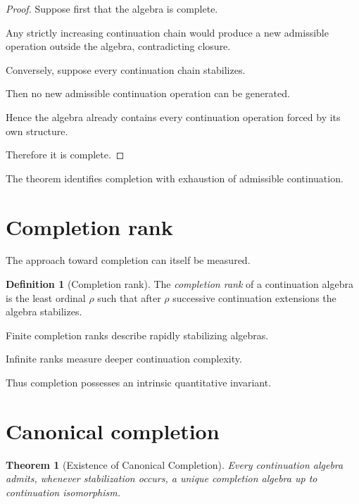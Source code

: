 \documentclass[13pt,openany]{book}
\theoremstyle{plain}
\newtheorem{theorem}{Theorem}[chapter]
\theoremstyle{definition}
\newtheorem{definition}{Definition}[chapter]
\begin{document}
\begin{proof}

Suppose first that the algebra is complete.

Any strictly increasing continuation chain would produce a new admissible
operation outside the algebra, contradicting closure.

Conversely, suppose every continuation chain stabilizes.

Then no new admissible continuation operation can be generated.

Hence the algebra already contains every continuation operation forced by its
own structure.

Therefore it is complete.

\end{proof}

The theorem identifies completion with exhaustion of admissible continuation.

\section{Completion rank}

The approach toward completion can itself be measured.

\begin{definition}[Completion rank]

The \emph{completion rank} of a continuation algebra is the least ordinal
\(\rho\) such that after \(\rho\) successive continuation extensions the
algebra stabilizes.

\end{definition}

Finite completion ranks describe rapidly stabilizing algebras.

Infinite ranks measure deeper continuation complexity.

Thus completion possesses an intrinsic quantitative invariant.

\section{Canonical completion}

\begin{theorem}[Existence of Canonical Completion]

Every continuation algebra admits, whenever stabilization occurs, a unique
completion algebra up to continuation isomorphism.

\end{theorem}
\end{document}
